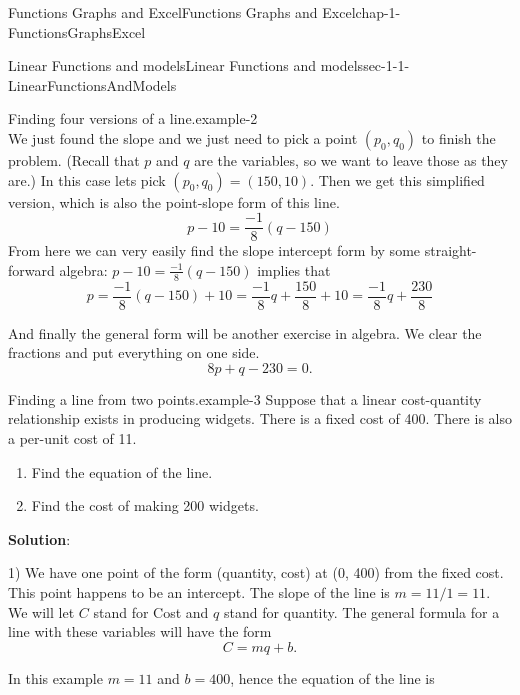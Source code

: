 \documentclass[oneside,10pt,]{book}
\newcommand{\terminology}[1]{\textbf{#1}}
\numberwithin{equation}{section}
\begin{document}
\begin{chapterptx}{Functions Graphs and Excel}{}{Functions Graphs and Excel}{}{}{chap-1-FunctionsGraphsExcel}
\begin{sectionptx}{Linear Functions and models}{}{Linear Functions and models}{}{}{sec-1-1-LinearFunctionsAndModels}
\begin{example}{Finding four versions of a line.}{example-2}
\begin{equation*}
\end{equation*}
We just found the slope and we just need to pick a point \((p_0,q_0)\) to finish the problem. (Recall that \(p\) and \(q\) are the variables, so we want to leave those as they are.) In this case lets pick \((p_0,q_0)= (150,10)\). Then we get this simplified version, which is also the point-slope form of this line.%
\begin{equation*}
p-10=\frac{-1}{8}(q-150)
\end{equation*}
From here we can very easily find the slope intercept form by some straight-forward algebra: \(p-10=\frac{-1}{8}(q-150)\) implies that%
\begin{equation*}
p=\frac{-1}{8} (q-150)+10=  \frac{-1}{8} q+  \frac{150}{8}+10=  \frac{-1}{8} q+\frac{230}{8}
\end{equation*}
%
\par
\hypertarget{p-47}{}%
And finally the general form will be another exercise in algebra. We clear the fractions and put everything on one side.%
\begin{equation*}
8p+q-230=0.
\end{equation*}
%
\end{example}
\begin{example}{Finding a line from two points.}{example-3}%
\hypertarget{p-48}{}%
Suppose that a linear cost-quantity relationship exists in producing widgets.  There is a fixed cost of \textdollar{}400.  There is also a per-unit cost of \textdollar{}11.%
\leavevmode%
\begin{enumerate}[label=(\alph*)]
\item\hypertarget{li-17}{}\hypertarget{p-49}{}%
Find the equation of the line.%
\item\hypertarget{li-18}{}\hypertarget{p-50}{}%
Find the cost of making 200 widgets.%
\end{enumerate}
\hypertarget{p-51}{}%
\terminology{Solution}:%
\par
\hypertarget{p-52}{}%
1) We have one point of the form (quantity, cost) at (0, 400) from the fixed cost.  This point happens to be an intercept.  The slope of the line is \(m=11/1=11\).  We will let \(C\) stand for Cost and \(q\) stand for quantity. The general formula for a line with these variables will have the form%
\begin{equation*}
C=m q+b.
\end{equation*}
%
\par
\hypertarget{p-53}{}%
In this example \(m = 11\) and \(b = 400\), hence the equation of the line is%
\begin{equation*}

\end{equation*}
\end{example}
\end{sectionptx}
\end{chapterptx}
\end{document}
